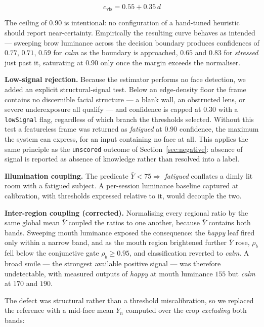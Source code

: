 \documentclass[runningheads]{llncs}
\begin{document}
\begin{equation}
c_{\text{vis}} = 0.55 + 0.35\,d
\label{eq:visconf}
\end{equation}

The ceiling of $0.90$ is intentional: no configuration of a hand-tuned
heuristic should report near-certainty. Empirically the resulting curve
behaves as intended --- sweeping brow luminance across the decision boundary
produces confidences of $0.77$, $0.71$, $0.59$ for \textit{calm} as the
boundary is approached, $0.65$ and $0.83$ for \textit{stressed} just past it,
saturating at $0.90$ only once the margin exceeds the normaliser.

\textbf{Low-signal rejection.} Because the estimator performs no face
detection, we added an explicit structural-signal test. Below an edge-density
floor the frame contains no discernible facial structure --- a blank wall, an
obstructed lens, or severe underexposure all qualify --- and confidence is
capped at $0.30$ with a \texttt{lowSignal} flag, regardless of which branch
the thresholds selected. Without this test a featureless frame was returned as
\textit{fatigued} at $0.90$ confidence, the maximum the system can express,
for an input containing no face at all. This applies the same principle as the
\texttt{unscored} outcome of Section~\ref{sec:negative}: absence of signal is
reported as absence of knowledge rather than resolved into a label.

\textbf{Illumination coupling.} The predicate $\bar{Y} < 75 \Rightarrow$
\textit{fatigued} conflates a dimly lit room with a fatigued subject. A
per-session luminance baseline captured at calibration, with thresholds
expressed relative to it, would decouple the two.

\textbf{Inter-region coupling (corrected).} Normalising every regional ratio
by the same global mean $\bar{Y}$ coupled the ratios to one another, because
$\bar{Y}$ contains both bands. Sweeping mouth luminance exposed the
consequence: the \textit{happy} leaf fired only within a narrow band, and as
the mouth region brightened further $\bar{Y}$ rose, $\rho_b$ fell below the
conjunctive gate $\rho_b \geq 0.95$, and classification reverted to
\textit{calm}. A broad smile --- the strongest available positive signal ---
was therefore undetectable, with measured outputs of \textit{happy} at mouth
luminance $155$ but \textit{calm} at $170$ and $190$.

The defect was structural rather than a threshold miscalibration, so we
replaced the reference with a mid-face mean $\bar{Y}_n$ computed over the crop
\emph{excluding} both bands:
\end{document}
